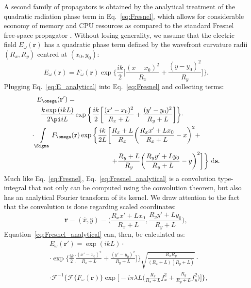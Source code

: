 \documentclass{iucr}              %
\begin{document}
A second family of propagators is obtained by the analytical treatment of the quadratic radiation phase term in Eq.~\ref{eq:Fresnel}, which allows for considerable economy of memory and CPU resources as compared to the standard Fresnel free-space propagator \cite{ChubarCelestre}. Without losing generality, we assume that the electric field $E_\omega(\textbf{r})$ has a quadratic phase term defined by the wavefront curvature radii $(R_x, R_y)$ centred at $(x_0,y_0)$:
 \begin{equation}\label{eq:E_analytical}
    E_\omega(\textbf{r}) = F_\omega(\textbf{r})\exp\bigg\{ \frac{ik}{2}\bigg[ \frac{(x-x_0)^2}{R_x} + \frac{(y-y_0)^2}{R_y} \bigg]\bigg\}.
\end{equation}
Plugging Eq.~\ref{eq:E_analytical} into Eq.~\ref{eq:Fresnel} and collecting terms:
\begin{equation}\label{eq:Fresnel_analytical}
\begin{split}
    E_\omega(\textbf{r}') = \qquad\qquad\qquad\qquad\qquad\qquad\qquad\qquad\qquad\quad &\\
    \frac{k\exp{(ikL)}}{2\pi i L}\exp\bigg\{ \frac{ik}{2}\bigg[ \frac{(x'-x_0)^2}{R_x+L} + \frac{(y'-y_0)^2}{R_y+L} \bigg] \bigg\}\cdot \qquad\quad &\\
    \cdot\int\limits_{\Sigma}{F_\omega(\textbf{r})\exp{\bigg\{ \frac{ik}{2L}\bigg[ \frac{R_x+L}{R_x}\bigg(\frac{R_xx'+Lx_0}{R_x+L}-x\bigg)^2+}} \enspace\\
    \hfill+ \frac{R_y+L}{R_y}\bigg(\frac{R_yy'+Ly_0}{R_y+L}-y\bigg)^2\bigg] & \bigg\}~\mathrm{d}\textbf{s}.
\end{split}
\end{equation}
Much like Eq.~\ref{eq:Fresnel}, Eq.~\ref{eq:Fresnel_analytical} is a convolution type-integral that not only can be computed using the convolution theorem, but also has an analytical Fourier transform of its kernel. We draw attention to the fact that the convolution is done regarding scaled coordinates:
\begin{equation}\label{eq:coordinates}
\hat{\textbf{r}}=(\hat{x},\hat{y})=\bigg(\frac{R_xx'+Lx_0}{R_x+L}, \frac{R_yy'+Ly_0}{R_y+L}\bigg),
\end{equation}
Equation~\ref{eq:Fresnel_analytical} can, then, be calculated as:
\begin{equation}\label{eq:Fresnel_analyticalConv}
\begin{split}
&E_\omega(\textbf{r}') =\exp{(ikL)}\cdot\\
&\cdot\exp\bigg\{ \frac{ik}{2}\bigg[ \frac{(x'-x_0)^2}{R_x+L} + \frac{(y'-y_0)^2}{R_y+L} \bigg] \bigg\}\sqrt{\frac{R_xR_y}{(R_x+L)(R_y+L)}}\cdot\\
&\cdot\mathcal{F}^{-1}\bigg\{\mathcal{F}\{F_\omega(\textbf{r})\}\exp\bigg[-i\pi\lambda L\bigg(\frac{R_x}{R_x+L}f_x^2 +\frac{R_y}{R_y+L}f_y^2\bigg)\bigg]\bigg\},
\end{split}
\end{equation}
\end{document}

